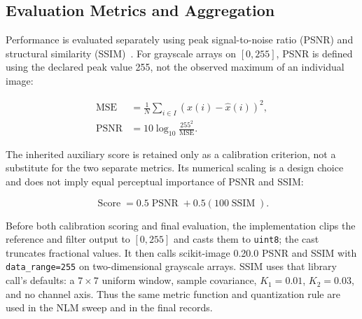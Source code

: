 \documentclass[pdflatex,iicol,sn-mathphys-num]{sn-jnl}
\newif\ifshowportuguese
\newcommand{\pt}[1]{\ifshowportuguese\par\begingroup\small\color{blue!55!black}\noindent\textbf{PT: }#1\par\endgroup\fi}
\begin{document}
\subsection{Evaluation Metrics and Aggregation}
\label{subsec:metrics_aggregation}

Performance is evaluated separately using peak signal-to-noise ratio (PSNR) and structural similarity (SSIM)~\cite{wang2004ssim}. For grayscale arrays on $[0,255]$, PSNR is defined using the declared peak value 255, not the observed maximum of an individual image:
\pt{O desempenho é avaliado separadamente por razão sinal-ruído de pico (PSNR) e similaridade estrutural (SSIM)~\cite{wang2004ssim}. Para arrays em tons de cinza em $[0,255]$, o PSNR é definido usando o pico declarado 255, não o máximo observado de uma imagem individual:}
\begin{equation}
\begin{aligned}
\operatorname{MSE}&=\frac{1}{N}\sum_{i\in I}(x(i)-\hat{x}(i))^2,\\
\operatorname{PSNR}&=10\log_{10}\frac{255^2}{\operatorname{MSE}}.
\end{aligned}
\label{eq:psnr}
\end{equation}

The inherited auxiliary score is retained only as a calibration criterion, not a substitute for the two separate metrics. Its numerical scaling is a design choice and does not imply equal perceptual importance of PSNR and SSIM:
\pt{O score auxiliar herdado é mantido apenas como critério de calibração, não como substituto das duas métricas separadas. Sua escala numérica é uma escolha de projeto e não implica igual importância perceptual de PSNR e SSIM:}
\begin{equation}
\operatorname{Score}=0.5\operatorname{PSNR}+0.5(100\operatorname{SSIM}).
\label{eq:score}
\end{equation}

Before both calibration scoring and final evaluation, the implementation clips the reference and filter output to $[0,255]$ and casts them to \texttt{uint8}; the cast truncates fractional values. It then calls scikit-image 0.20.0 PSNR and SSIM with \texttt{data\_range=255} on two-dimensional grayscale arrays. SSIM uses that library call's defaults: a $7\times7$ uniform window, sample covariance, $K_1=0.01$, $K_2=0.03$, and no channel axis. Thus the same metric function and quantization rule are used in the NLM sweep and in the final records.
\pt{Antes da pontuação da calibração e da avaliação final, a implementação limita a referência e a saída do filtro a $[0,255]$ e as converte para \texttt{uint8}; a conversão trunca valores fracionários. Em seguida, chama PSNR e SSIM do scikit-image 0.20.0 com \texttt{data\_range=255} em arrays bidimensionais em tons de cinza. O SSIM usa os padrões dessa chamada: janela uniforme $7\times7$, covariância amostral, $K_1=0.01$, $K_2=0.03$ e nenhuma dimensão de canal. Assim, a mesma função de métrica e regra de quantização são usadas na varredura NLM e nos registros finais.}
\end{document}
